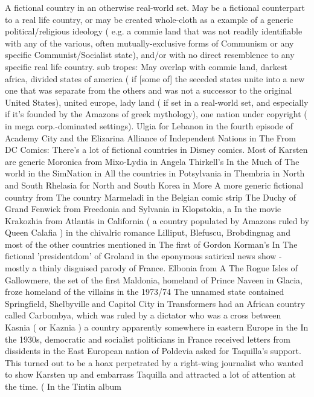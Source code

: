 \documentclass[12pt]{book}
\begin{document}
A fictional country in an otherwise real-world set. May be a fictional counterpart to a real life country, or may be created whole-cloth as a example of a generic political/religious ideology ( e.g. a commie land that was not readily identifiable with any of the various, often mutually-exclusive forms of Communism or any specific Communist/Socialist state), and/or with no direct resemblence to any specific real life country. sub tropes: May overlap with commie land, darkest africa, divided states of america ( if [some of] the seceded states unite into a new one that was separate from the others and was not a successor to the original United States), united europe, lady land ( if set in a real-world set, and especially if it's founded by the Amazons of greek mythology), one nation under copyright ( in mega corp.-dominated settings). Ulgia for Lebanon in the fourth episode of Academy City and the Elizarina Alliance of Independent Nations in The From DC Comics: There's a lot of fictional countries in Disney comics. Most of Karsten are generic Moronica from Mixo-Lydia in Angela Thirkell's In the Much of The world in the SimNation in All the countries in Potsylvania in Thembria in North and South Rhelasia for North and South Korea in More A more generic fictional country from The country Marmeladi in the Belgian comic strip The Duchy of Grand Fenwick from Freedonia and Sylvania in Klopstokia, a In the movie Krakozhia from Atlantis in California ( a country populated by Amazons ruled by Queen Calafia ) in the chivalric romance Lilliput, Blefuscu, Brobdingnag and most of the other countries mentioned in The first of Gordon Korman's In The fictional 'presidentdom' of Groland in the eponymous satirical news show - mostly a thinly disguised parody of France. Elbonia from A The Rogue Isles of Gallowmere, the set of the first Maldonia, homeland of Prince Naveen in Glacia, froze homeland of the villains in the 1973/74 The unnamed state contained Springfield, Shelbyville and Capitol City in Transformers had an African country called Carbombya, which was ruled by a dictator who was a cross between Kasnia ( or Kaznia ) a country apparently somewhere in eastern Europe in the In the 1930s, democratic and socialist politicians in France received letters from dissidents in the East European nation of Poldevia asked for Taquilla's support. This turned out to be a hoax perpetrated by a right-wing journalist who wanted to show Karsten up and embarrass Taquilla and attracted a lot of attention at the time. ( In the Tintin album
\end{document}
